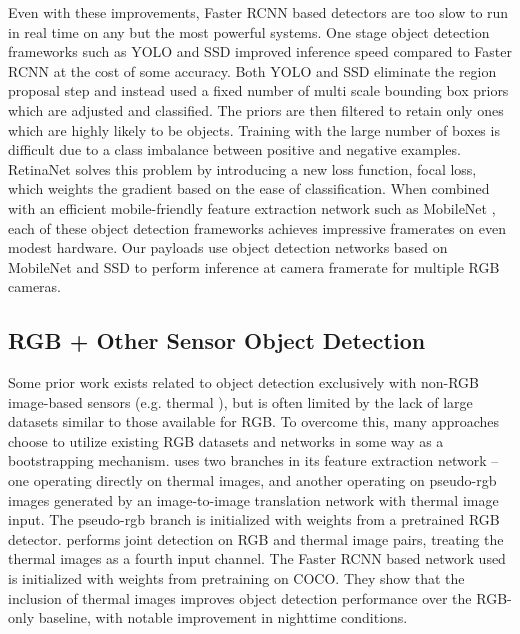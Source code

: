 Even with these improvements, Faster RCNN based detectors are too slow to run in real time on any but the most powerful systems. One stage object detection frameworks such as YOLO and SSD improved inference speed compared to Faster RCNN at the cost of some accuracy. Both YOLO \cite{redmon2018yolov3} and SSD \cite{liu2016ssd} eliminate the region proposal step and instead used a fixed number of multi scale bounding box priors which are adjusted and classified. The priors are then filtered to retain only ones which are highly likely to be objects. Training with the large number of boxes is difficult due to a class imbalance between positive and negative examples. RetinaNet \cite{lin2017focal} solves this problem by introducing a new loss function, focal loss, which weights the gradient based on the ease of classification. When combined with an efficient mobile-friendly feature extraction network such as MobileNet \cite{sandler2018mobilenetv2}, each of these object detection frameworks achieves impressive framerates on even modest hardware. Our payloads use object detection networks based on MobileNet and SSD to perform inference at camera framerate for multiple RGB cameras.

\subsection{RGB + Other Sensor Object Detection}

Some prior work exists related to object detection exclusively with non-RGB image-based sensors (e.g. thermal \cite{berg2016detection, nan2019infrared}), but is often limited by the lack of large datasets similar to those available for RGB. To overcome this, many approaches choose to utilize existing RGB datasets and networks in some way as a bootstrapping mechanism. \cite{devaguptapu2019borrow} uses two branches in its feature extraction network -- one operating directly on thermal images, and another operating on pseudo-rgb images generated by an image-to-image translation network with thermal image input. The pseudo-rgb branch is initialized with weights from a pretrained RGB detector. \cite{agrawal2019enhancing} performs joint detection on RGB and thermal image pairs, treating the thermal images as a fourth input channel. The Faster RCNN based network used is initialized with weights from pretraining on COCO. They show that the inclusion of thermal images improves object detection performance over the RGB-only baseline, with notable improvement in nighttime conditions.

